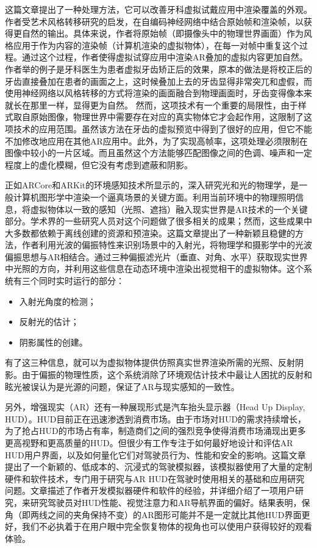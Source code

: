 这篇文章\cite{VasSor19}提出了一种处理方法，它可以改善牙科虚拟试戴应用中渲染覆盖的外观。作者受艺术风格转移研究的启发，在自编码神经网络中结合原始帧和渲染帧，以获得更自然的输出。具体来说，作者将原始帧（即摄像头中的物理世界画面）作为风格应用于作为内容的渲染帧（计算机渲染的虚拟物体），在每一对帧中重复这个过程。通过这个过程，作者使得虚拟试穿应用中渲染AR叠加的虚拟内容更加自然。作者举的例子是牙科医生为患者虚拟牙齿矫正后的效果，原本的做法是将校正后的牙齿直接叠加在患者的画面之上，这时候叠加上去的牙齿显得非常突兀和虚假，而使用神经网络以风格转移的方式将渲染的画面融合到物理画面时，牙齿变得像本来就长在那里一样，显得更为自然。
然而，这项技术有一个重要的局限性，由于样式取自原始图像，物理世界中需要存在对应的真实物体它才会起作用，这限制了这项技术的应用范围。虽然该方法在牙齿的虚拟预览中得到了很好的应用，但它不能不加修改地应用在其他AR应用中。此外，为了实现高帧率，这项处理必须限制在图像中较小的一片区域。而且虽然这个方法能够匹配图像之间的色调、噪声和一定程度上的虚化模糊，但它没有考虑到遮蔽和阴影。

正如ARCore和ARKit的环境感知技术所显示的，深入研究光和光的物理学，是一般计算机图形学中渲染一个逼真场景的关键方面。利用当前环境中的物理照明信息，将虚拟物体以一致的感知（光照、遮挡）融入现实世界是AR技术的一个关键部分。学术界的一些研究人员对这个问题做了很多相关的成果；然而，这些成果中大多数都依赖于离线创建的资源和预渲染。这篇文章\cite{AlhTuc19}提出了一种新颖且稳健的方法，作者利用光波的偏振特性来识别场景中的入射光，将物理学和摄影学中的光波偏振思想与AR相结合。通过三种偏振滤光片（垂直、对角、水平）获取现实世界中光照的方向，并利用这些信息在动态环境中渲染出视觉相干的虚拟物体。这个系统有三个同时实时运行的部分：

\begin{itemize}
	\item 入射光角度的检测；
	\item 反射光的估计；
	\item 阴影属性的创建。
\end{itemize}

有了这三种信息，就可以为虚拟物体提供仿照真实世界渲染所需的光照、反射阴影。由于偏振的物理性质，这个系统消除了环境观估计技术中最让人困扰的反射和眩光被误认为是光源的问题，保证了AR与现实感知的一致性。

另外，增强现实（AR）还有一种展现形式是汽车抬头显示器（Head Up Display, HUD）。HUD目前正在迅速渗透到消费市场。由于市场对HUD的需求持续增长，为了抢占HUD的市场占有率，制造商们之间的强烈竞争使得消费市场涌现出更多更高视野和更高质量的HUD。但很少有工作专注于如何最好地设计和评估AR HUD用户界面，以及如何量化它们对驾驶员行为、性能和安全的影响。这篇文章\cite{GabSmiTan19}提出了一个新颖的、低成本的、沉浸式的驾驶模拟器，该模拟器使用了大量的定制硬件和软件技术，专门用于研究与AR HUD在驾驶时使用相关的基础和应用研究问题。文章描述了作者开发模拟器硬件和软件的经验，并详细介绍了一项用户研究，来研究驾驶员对HUD性能、视觉注意力和AR导航界面的偏好。结果表明，保角（即两线之间的夹角保持不变）的AR图形可能并不是一定就比其他HUD界面更好，我们不必执着于在用户眼中完全恢复物体的视角也可以使用户获得较好的观看体验。

